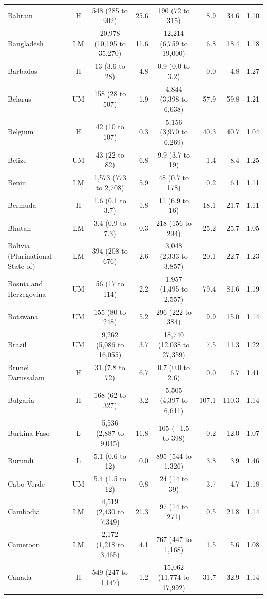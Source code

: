 \begin{longtable}{lccrcrrr}
Bahrain & H & 548 (285 to 902) & 25.6 & 190 (72 to 315) & 8.9 & 34.6 & 1.10 \\
Bangladesh & LM & 20,978 (10,195 to 35,270) & 11.6 & 12,214 (6,759 to 19,000) & 6.8 & 18.4 & 1.18 \\
Barbados & H & 13 (3.6 to 28) & 4.8 & 0.9 (0.0 to 3.2) & 0.0 & 4.8 & 1.27 \\
Belarus & UM & 158 (28 to 507) & 1.9 & 4,844 (3,398 to 6,638) & 57.9 & 59.8 & 1.21 \\
Belgium & H & 42 (10 to 107) & 0.3 & 5,156 (3,970 to 6,269) & 40.3 & 40.7 & 1.04 \\
Belize & UM & 43 (22 to 82) & 6.8 & 9.9 (3.7 to 19) & 1.4 & 8.4 & 1.25 \\
Benin & LM & 1,573 (773 to 2,708) & 5.9 & 48 (0.7 to 178) & 0.2 & 6.1 & 1.11 \\
Bermuda & H & 1.6 (0.1 to 3.7) & 1.8 & 11 (6.9 to 16) & 18.1 & 21.7 & 1.11 \\
Bhutan & LM & 3.4 (0.9 to 7.3) & 0.3 & 218 (156 to 294) & 25.2 & 25.7 & 1.05 \\
Bolivia (Plurinational State of) & LM & 394 (208 to 676) & 2.6 & 3,048 (2,333 to 3,857) & 20.1 & 22.7 & 1.23 \\
Bosnia and Herzegovina & UM & 56 (17 to 114) & 2.2 & 1,957 (1,495 to 2,557) & 79.4 & 81.6 & 1.19 \\
Botswana & UM & 155 (80 to 248) & 5.2 & 296 (222 to 384) & 9.9 & 15.0 & 1.14 \\
Brazil & UM & 9,262 (5,086 to 16,055) & 3.7 & 18,740 (12,038 to 27,359) & 7.5 & 11.3 & 1.22 \\
Brunei Darussalam & H & 31 (7.8 to 72) & 6.7 & 0.7 (0.0 to 2.6) & 0.0 & 6.7 & 1.41 \\
Bulgaria & H & 168 (62 to 327) & 3.2 & 5,505 (4,397 to 6,611) & 107.1 & 110.3 & 1.14 \\
Burkina Faso & L & 5,536 (2,887 to 9,045) & 11.8 & 105 ($-$1.5 to 398) & 0.2 & 12.0 & 1.07 \\
Burundi & L & 5.1 (0.6 to 12) & 0.0 & 895 (544 to 1,326) & 3.8 & 3.9 & 1.46 \\
Cabo Verde & UM & 5.4 (1.5 to 12) & 0.8 & 24 (14 to 39) & 3.7 & 4.7 & 1.18 \\
Cambodia & LM & 4,519 (2,430 to 7,349) & 21.3 & 97 (14 to 271) & 0.5 & 21.8 & 1.14 \\
Cameroon & LM & 2,172 (1,218 to 3,465) & 4.1 & 767 (447 to 1,168) & 1.5 & 5.6 & 1.08 \\
Canada & H & 549 (247 to 1,147) & 1.2 & 15,062 (11,774 to 17,992) & 31.7 & 32.9 & 1.14 \\

\end{longtable}

